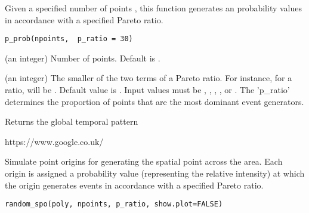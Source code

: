 \documentclass[a4paper]{book}
\begin{document}
%
\begin{Description}\relax
Given a specified number of points ,
this function generates an  probability values
in accordance with a specified Pareto ratio.
\end{Description}
%
\begin{Usage}
\begin{verbatim}
p_prob(npoints,  p_ratio = 30)
\end{verbatim}
\end{Usage}
%
\begin{Arguments}
\begin{ldescription}
\item[\code{npoints}] (an integer) Number of points. Default is
.

\item[\code{p\_ratio}] (an integer) The smaller of the
two terms of a Pareto ratio. For instance, for a
 ratio,  will be . Default value is
. Input values must be , , ,
, or . The 'p\_ratio'
determines the proportion of points that are the most
dominant event generators.
\end{ldescription}
\end{Arguments}
%
\begin{Value}
Returns the global temporal pattern
\end{Value}
%
\begin{References}\relax
https://www.google.co.uk/
\end{References}
%
\begin{Description}\relax
Simulate point origins for generating the
spatial point across the area. Each origin is assigned
a probability value (representing the relative intensity) at which
the origin generates events in accordance with a specified
Pareto ratio.
\end{Description}
%
\begin{Usage}
\begin{verbatim}
random_spo(poly, npoints, p_ratio, show.plot=FALSE)
\end{verbatim}
\end{Usage}
%
\end{document}
